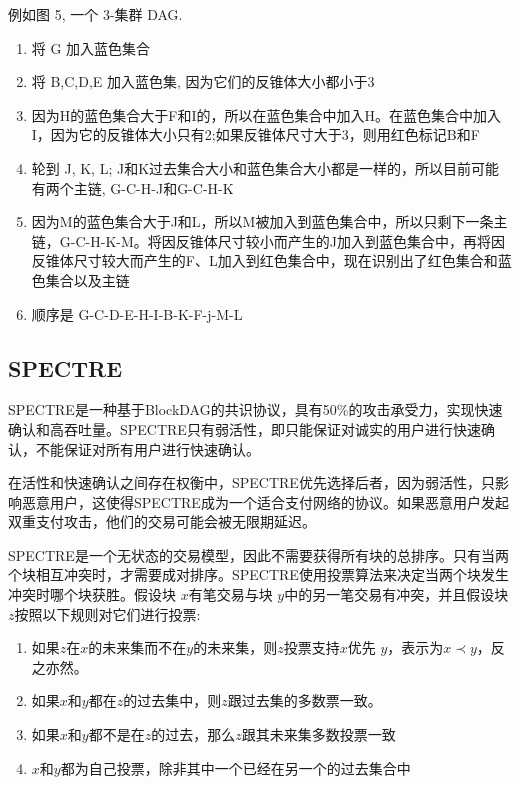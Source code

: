 \documentclass[a4paper,11pt]{article}
\begin{document}
例如图 5, 一个 3-集群 DAG. 

\begin{enumerate}
	\item 将 G 加入蓝色集合 
	\item 将 B,C,D,E 加入蓝色集, 因为它们的反锥体大小都小于3 
	\item 因为H的蓝色集合大于F和I的，所以在蓝色集合中加入H。在蓝色集合中加入I，因为它的反锥体大小只有2;如果反锥体尺寸大于3，则用红色标记B和F 
	\item 轮到 J, K, L;	J和K过去集合大小和蓝色集合大小都是一样的，所以目前可能有两个主链, G-C-H-J和G-C-H-K 
	\item 因为M的蓝色集合大于J和L，所以M被加入到蓝色集合中，所以只剩下一条主链，G-C-H-K-M。将因反锥体尺寸较小而产生的J加入到蓝色集合中，再将因反锥体尺寸较大而产生的F、L加入到红色集合中，现在识别出了红色集合和蓝色集合以及主链
	\item 顺序是 G-C-D-E-H-I-B-K-F-j-M-L
\end{enumerate}

\subsection{SPECTRE}

SPECTRE\cite{SPECTRE}是一种基于BlockDAG的共识协议，具有50\%的攻击承受力，实现快速确认和高吞吐量。SPECTRE只有弱活性，即只能保证对诚实的用户进行快速确认，不能保证对所有用户进行快速确认。

在活性和快速确认之间存在权衡中，SPECTRE优先选择后者，因为弱活性，只影响恶意用户，这使得SPECTRE成为一个适合支付网络的协议。如果恶意用户发起双重支付攻击，他们的交易可能会被无限期延迟。

SPECTRE是一个无状态的交易模型，因此不需要获得所有块的总排序。只有当两个块相互冲突时，才需要成对排序。SPECTRE使用投票算法来决定当两个块发生冲突时哪个块获胜。假设块 $x$有笔交易与块 $y$中的另一笔交易有冲突，并且假设块 $z$按照以下规则对它们进行投票:

\begin{enumerate}
	\item 如果$z$在$x$的未来集而不在$y$的未来集，则$z$投票支持$x$优先 $y$，表示为$x \prec y$，反之亦然。
	\item 如果$x$和$y$都在$z$的过去集中，则$z$跟过去集的多数票一致。
	\item 如果$x$和$y$都不是在$z$的过去，那么$z$跟其未来集多数投票一致
	\item $x$和$y$都为自己投票，除非其中一个已经在另一个的过去集合中
\end{enumerate}
\end{document}
